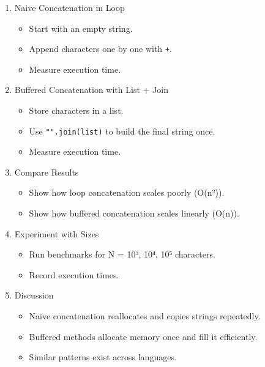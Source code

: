 \documentclass[
  letterpaper,
  DIV=11,
  numbers=noendperiod]{scrreprt}
\providecommand{\tightlist}{%
  \setlength{\itemsep}{0pt}\setlength{\parskip}{0pt}}
\begin{document}
\begin{enumerate}
\def\labelenumi{\arabic{enumi}.}
\item
  Naive Concatenation in Loop

  \begin{itemize}
  \tightlist
  \item
    Start with an empty string.
  \item
    Append characters one by one with \texttt{+}.
  \item
    Measure execution time.
  \end{itemize}
\item
  Buffered Concatenation with List + Join

  \begin{itemize}
  \tightlist
  \item
    Store characters in a list.
  \item
    Use \texttt{"".join(list)} to build the final string once.
  \item
    Measure execution time.
  \end{itemize}
\item
  Compare Results

  \begin{itemize}
  \tightlist
  \item
    Show how loop concatenation scales poorly (O(n²)).
  \item
    Show how buffered concatenation scales linearly (O(n)).
  \end{itemize}
\item
  Experiment with Sizes

  \begin{itemize}
  \tightlist
  \item
    Run benchmarks for N = 10³, 10⁴, 10⁵ characters.
  \item
    Record execution times.
  \end{itemize}
\item
  Discussion

  \begin{itemize}
  \tightlist
  \item
    Naive concatenation reallocates and copies strings repeatedly.
  \item
    Buffered methods allocate memory once and fill it efficiently.
  \item
    Similar patterns exist across languages.
  \end{itemize}
\end{enumerate}
\end{document}
